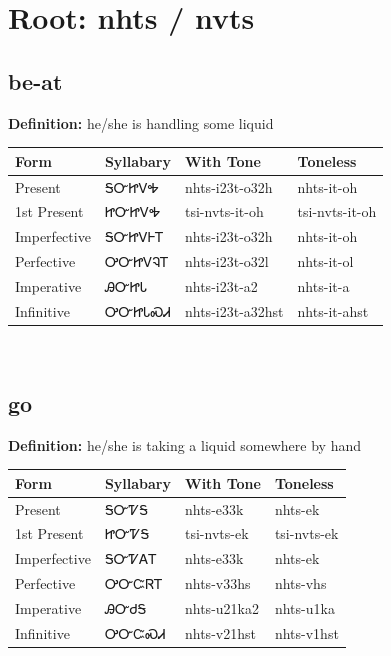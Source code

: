 \documentclass{article}%
\begin{document}
%
\normalsize%
\section*{Root: nhts / nvts}%
\subsection*{be-at}%
\textbf{Definition: }%
he/she is handling some liquid%
\\[0.5em]%
\begin{tabular}{|l|l|l|l|}%
\hline%
\textbf{Form}&\textbf{Syllabary}&\textbf{With Tone}&\textbf{Toneless}\\%
\hline%
Present&ᎦᏅᏥᏙᎭ&nhts{-}i23t{-}o32h&nhts{-}it{-}oh\\%
1st Present&ᏥᏅᏥᏙᎭ&tsi{-}nvts{-}it{-}oh&tsi{-}nvts{-}it{-}oh\\%
Imperfective&ᎦᏅᏥᏙᎰᎢ&nhts{-}i23t{-}o32h&nhts{-}it{-}oh\\%
Perfective&ᎤᏅᏥᏙᎸᎢ&nhts{-}i23t{-}o32l&nhts{-}it{-}ol\\%
Imperative&ᎯᏅᏥᏓ&nhts{-}i23t{-}a2&nhts{-}it{-}a\\%
Infinitive&ᎤᏅᏥᏓᏍᏗ&nhts{-}i23t{-}a32hst&nhts{-}it{-}ahst\\%
\hline%
\end{tabular}%
\\[1em]%
\subsection*{go}%
\textbf{Definition: }%
he/she is taking a liquid somewhere by hand%
\\[0.5em]%
\begin{tabular}{|l|l|l|l|}%
\hline%
\textbf{Form}&\textbf{Syllabary}&\textbf{With Tone}&\textbf{Toneless}\\%
\hline%
Present&ᎦᏅᏤᎦ&nhts{-}e33k&nhts{-}ek\\%
1st Present&ᏥᏅᏤᎦ&tsi{-}nvts{-}ek&tsi{-}nvts{-}ek\\%
Imperfective&ᎦᏅᏤᎪᎢ&nhts{-}e33k&nhts{-}ek\\%
Perfective&ᎤᏅᏨᏒᎢ&nhts{-}v33hs&nhts{-}vhs\\%
Imperative&ᎯᏅᏧᎦ&nhts{-}u21ka2&nhts{-}u1ka\\%
Infinitive&ᎤᏅᏨᏍᏗ&nhts{-}v21hst&nhts{-}v1hst\\%
\hline%
\end{tabular}%
\\[1em]%
\end{document}
